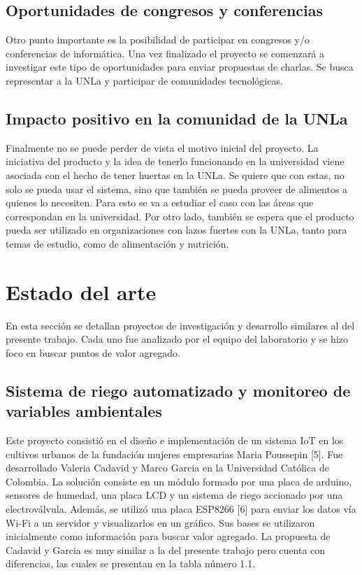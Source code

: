 \subsection{Oportunidades de congresos y conferencias}
Otro punto importante es la posibilidad de participar en congresos y/o conferencias de informática. Una vez finalizado el proyecto se comenzará a investigar este tipo de oportunidades para enviar propuestas de charlas. Se busca representar a la UNLa y participar de comunidades tecnológicas.

\subsection{Impacto positivo en la comunidad de la UNLa}
Finalmente no se puede perder de vista el motivo inicial del proyecto. La iniciativa del producto y la idea de tenerlo funcionando en la universidad viene asociada con el hecho de tener huertas en la UNLa. Se quiere que con estas, no solo se pueda usar el sistema, sino que también se pueda proveer de alimentos a quienes lo necesiten. Para esto se va a estudiar el caso con las áreas que correspondan en la universidad. Por otro lado, también se espera que el producto pueda ser utilizado en organizaciones con lazos fuertes con la UNLa, tanto para temas de estudio, como de alimentación y nutrición.


\section{Estado del arte}
En esta sección se detallan proyectos de investigación y desarrollo similares al del presente trabajo. Cada uno fue analizado por el equipo del laboratorio y se hizo foco en buscar puntos de valor agregado.\\

\subsection{Sistema de riego automatizado y monitoreo de variables ambientales}
Este proyecto consistió en el diseño e implementación de un sistema IoT en los cultivos urbanos de la fundación mujeres empresarias Maria Poussepin [5].
Fue desarrollado Valeria Cadavid y Marco Garcia en la Universidad Católica de Colombia.
La solución consiste en un módulo formado por una placa de arduino, sensores de humedad, una placa LCD y un sistema de riego accionado por una electroválvula. Además, se utilizó una placa ESP8266 [6] para enviar los datos vía Wi-Fi a un servidor y visualizarlos en un gráfico. Sus bases se utilizaron inicialmente como información para buscar valor agregado. La propuesta de Cadavid y Garcia es muy similar a la del presente trabajo pero cuenta con diferencias, las cuales se presentan en la tabla número 1.1.\\

